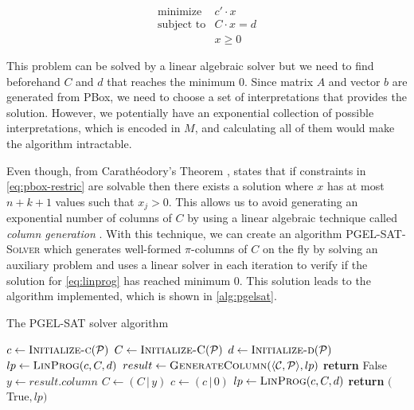 \begin{equation}
	\label{eq:linprog}
	\begin{array}{ll}
		\text{minimize}   & c' \cdot x    \\
		\text{subject to} & C \cdot x = d \\
		                  & x \geq 0
	\end{array}
\end{equation}

This problem can be solved by a linear algebraic solver but we need to find beforehand $C$ and $d$ that reaches the minimum 0. Since matrix $A$ and vector $b$ are generated from PBox, we need to choose a set of interpretations that provides the solution. However, we potentially have an exponential collection of possible interpretations, which is encoded in $M$, and calculating all of them would make the algorithm intractable.

Even though, from Carathéodory's Theorem \citep{eckhoff1993helly}, \citet{Fin2020} states that if constraints in \cref{eq:pbox-restric} are solvable then there exists  a solution where $x$ has at most $n + k + 1$ values such that $x_j > 0$. This allows us to avoid generating an exponential number of columns of $C$ by using a linear algebraic technique called \emph{column generation} \citep{gilmore1961linear,gilmore1963linear}. With this technique, we can create an algorithm \textsc{PGEL-SAT-Solver} which generates well-formed $\pi$-columns of $C$ on the fly by solving an auxiliary problem and uses a linear solver in each iteration to verify if the solution for \cref{eq:linprog} has reached minimum 0. This solution leads to the algorithm implemented, which is shown in \cref{alg:pgelsat}.

\begin{algorithm}
	\caption{The PGEL-SAT solver algorithm}
	\label{alg:pgelsat}
	\begin{algorithmic}[1]
		\State $c \gets \Call{Initialize-c}{\PP}$
		\State $C \gets \Call{Initialize-C}{\PP}$
		\State $d \gets \Call{Initialize-d}{\PP}$
		\Statex
		\State $lp \gets \Call{LinProg}{c, C, d}$
		\Statex
		\State $result \gets \Call{GenerateColumn}{\tuple{\CC, \PP}, lp}$
		\State \textbf{return} False 
		\EndIf
		\Statex
		\State $y \gets result.column$ 
		\State $C \gets ( C \, | \, y) $
		\State $c \gets (c \, | \, 0)$
		\State $lp \gets \Call{LinProg}{c, C, d}$
		\EndWhile
		\Statex
		\State \textbf{return} $($True$, lp)$ 
		\EndFunction
	\end{algorithmic}
\end{algorithm}

